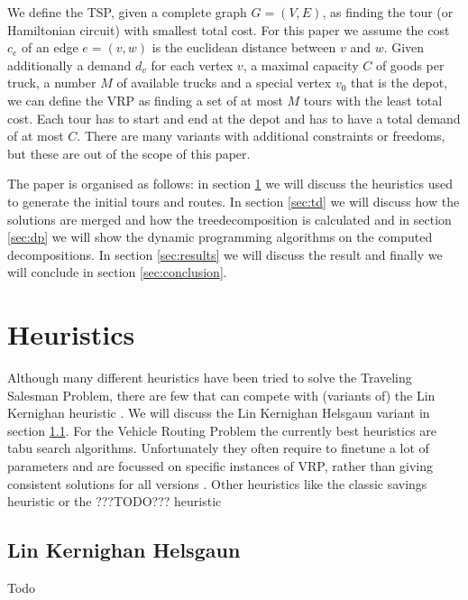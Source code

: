 \documentclass[12pt]{article}
\begin{document}
We define the TSP, given a complete graph $G = (V, E)$, as finding the tour (or Hamiltonian
circuit) with smallest total cost. For this paper we assume the cost $c_e$ of an edge $e = (v, w)$
is the euclidean distance between $v$ and $w$.
Given additionally a demand $d_v$ for each vertex $v$, a maximal capacity $C$ of goods per truck, a
number $M$ of available trucks and a special vertex $v_0$ that is the depot, we can define the VRP
as finding a set of at most $M$ tours with the least total cost. Each tour has to start and end at
the depot and has to have a total demand of at most $C$.
There are many variants with additional constraints or freedoms, but these are out of the scope of
this paper.

The paper is organised as follows: in section \ref{sec:heuristics} we will discuss the heuristics
used to generate the initial tours and routes. In section \ref{sec:td} we will discuss how the
solutions are merged and how the treedecomposition is calculated and in section \ref{sec:dp} we will
show the dynamic programming algorithms on the computed decompositions. In section \ref{sec:results}
we will discuss the result and finally we will conclude in section \ref{sec:conclusion}.



%
%
\section{Heuristics}
\label{sec:heuristics}
Although many different heuristics have been tried to solve the Traveling Salesman Problem, there
are few that can compete with (variants of) the Lin Kernighan heuristic \cite{lin-kernighan}. We
will discuss the Lin Kernighan Helsgaun variant in section \ref{sec:lkh}.
For the Vehicle Routing Problem the currently best heuristics are tabu search algorithms.
Unfortunately they often require to finetune a lot of parameters and are focussed on specific
instances of VRP, rather than giving consistent solutions for all versions \cite{hmmz, where to find
a godo citation for this one}. Other heuristics like the classic savings heuristic or the ???TODO???
heuristic 

\subsection{Lin Kernighan Helsgaun}
\label{sec:lkh}
Todo



%
%
\end{document}
